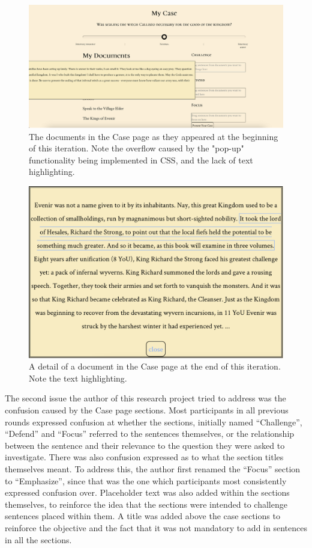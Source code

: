 \documentclass{l4proj}
\begin{document}
\begin{figure}[!htb]
    \centering
    \includegraphics[scale=0.6]{images/MyCase_1.png}
    \caption{The documents in the Case page as they appeared at the beginning of this iteration. Note the overflow caused by the "pop-up" functionality being implemented in CSS, and the lack of text highlighting.}
    \label{fig:Case1}
\end{figure}

\begin{figure}[!htb]
    \centering
    \includegraphics[scale=0.6]{images/MyCase_2.png}
    \caption{A detail of a document in the Case page at the end of this iteration. Note the text highlighting.}
    \label{fig:Case2}
\end{figure}

The second issue the author of this research project tried to address was the confusion caused by the Case page sections. Most participants in all previous rounds expressed confusion at whether the sections, initially named “Challenge”, “Defend” and “Focus” referred to the sentences themselves, or the relationship between the sentence and their relevance to the question they were asked to investigate. There was also confusion expressed as to what the section titles themselves meant. To address this, the author first renamed the “Focus” section to “Emphasize”, since that was the one which participants most consistently expressed confusion over. Placeholder text was also added within the sections themselves, to reinforce the idea that the sections were intended to challenge sentences placed within them. A title was added above the case sections to reinforce the objective and the fact that it was not mandatory to add in sentences in all the sections. 
\end{document}
